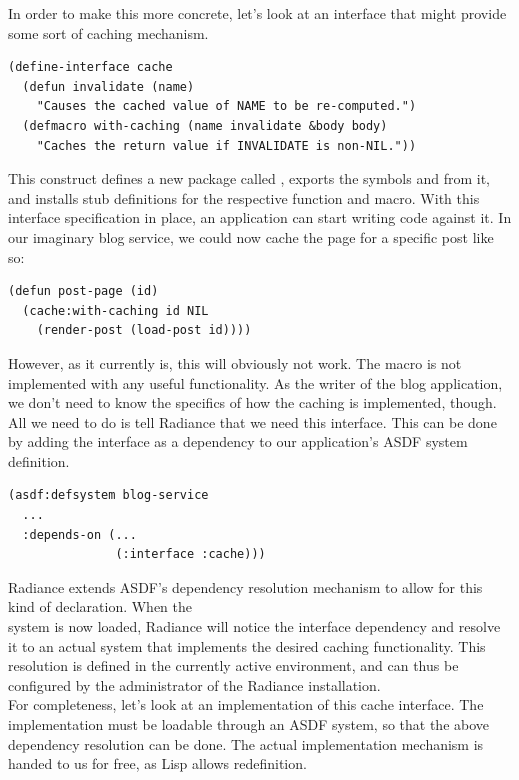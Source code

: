 \documentclass{sig-alternate}
\begin{document}
In order to make this more concrete, let's look at an interface that might provide some sort of caching mechanism.

\begin{verbatim}
(define-interface cache
  (defun invalidate (name)
    "Causes the cached value of NAME to be re-computed.")
  (defmacro with-caching (name invalidate &body body)
    "Caches the return value if INVALIDATE is non-NIL."))
\end{verbatim}

This construct defines a new package called , exports the symbols  and  from it, and installs stub definitions for the respective function and macro. With this interface specification in place, an application can start writing code against it. In our imaginary blog service, we could now cache the page for a specific post like so:

\begin{verbatim}
(defun post-page (id)
  (cache:with-caching id NIL
    (render-post (load-post id))))
\end{verbatim}

However, as it currently is, this will obviously not work. The  macro is not implemented with any useful functionality. As the writer of the blog application, we don't need to know the specifics of how the caching is implemented, though. All we need to do is tell Radiance that we need this interface. This can be done by adding the interface as a dependency to our application's ASDF\cite{asdf} system definition.

\begin{verbatim}
(asdf:defsystem blog-service
  ...
  :depends-on (...
               (:interface :cache)))
\end{verbatim}

Radiance extends ASDF's dependency resolution mechanism to allow for this kind of declaration. When the \\ system is now loaded, Radiance will notice the interface dependency and resolve it to an actual system that implements the desired caching functionality. This resolution is defined in the currently active environment, and can thus be configured by the administrator of the Radiance installation. \\

For completeness, let's look at an implementation of this cache interface. The implementation must be loadable through an ASDF system, so that the above dependency resolution can be done. The actual implementation mechanism is handed to us for free, as Lisp allows redefinition.
\end{document}
